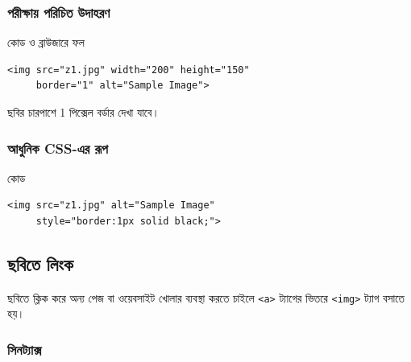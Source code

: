 \subsubsection{পরীক্ষায় পরিচিত উদাহরণ}

\begin{chFourWholeExample}{কোড ও ব্রাউজারে ফল}
\noindent
\begin{minipage}[t]{.50\linewidth}\vspace{0pt}

\begin{verbatim}
<img src="z1.jpg" width="200" height="150"
     border="1" alt="Sample Image">
\end{verbatim}

\end{minipage}\hfill
\begin{minipage}[t]{.46\linewidth}\vspace{0pt}
ছবির চারপাশে 1 পিক্সেল বর্ডার দেখা যাবে।
\end{minipage}
\end{chFourWholeExample}

\subsubsection{আধুনিক CSS-এর রূপ}

\begin{examplebox}{কোড}
\par\noindent\begin{minipage}{\linewidth}
\begin{verbatim}
<img src="z1.jpg" alt="Sample Image"
     style="border:1px solid black;">
\end{verbatim}
\end{minipage}\par
\end{examplebox}

\subsection{ছবিতে লিংক}

ছবিতে ক্লিক করে অন্য পেজ বা ওয়েবসাইট খোলার ব্যবস্থা করতে চাইলে \texttt{<a>} ট্যাগের ভিতরে \texttt{<img>} ট্যাগ বসাতে হয়।

\subsubsection{সিনট্যাক্স}

